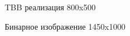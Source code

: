 \documentclass{report}
\begin{document}
\begin{figure}[H]
\caption{TBB реализация 800x500}
\end{figure}

\begin{figure}[H]
\caption{Бинарное изображение 1450x1000}
\end{figure}
\end{document}

